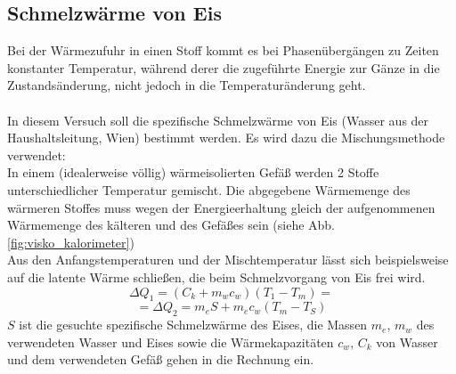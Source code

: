 \documentclass[12pt,a4paper]{article}
\begin{document}
\begin{multicols}{2}
\section{Schmelzwärme von Eis}
Bei der Wärmezufuhr in einen Stoff kommt es bei Phasenübergängen zu Zeiten konstanter Temperatur, während derer die zugeführte Energie zur Gänze in die Zustandsänderung, nicht jedoch in die Temperaturänderung geht.\\
\\
In diesem Versuch soll die spezifische Schmelzwärme von Eis (Wasser aus der Haushaltsleitung, Wien) bestimmt werden. Es wird dazu die Mischungsmethode verwendet:\\
In einem (idealerweise völlig) wärmeisolierten Gefäß werden 2 Stoffe unterschiedlicher Temperatur gemischt. Die abgegebene Wärmemenge des wärmeren Stoffes muss wegen der Energieerhaltung gleich der aufgenommenen Wärmemenge des kälteren und des Gefäßes sein (siehe Abb. \ref{fig:visko_kalorimeter})\\
Aus den Anfangstemperaturen und der Mischtemperatur lässt sich beispielsweise auf die latente Wärme schließen, die beim Schmelzvorgang von Eis frei wird.
$$\Delta Q_1=(C_k+m_wc_w)(T_1-T_m)=$$
$$=\Delta Q_2 = m_eS+m_ec_w(T_m-T_S)$$
$S$ ist die gesuchte spezifische Schmelzwärme des Eises, die Massen $m_e$, $m_w$ des verwendeten Wasser und Eises sowie die Wärmekapazitäten $c_w$, $C_k$ von Wasser und dem verwendeten Gefäß gehen in die Rechnung ein.\\



\end{multicols}
\end{document}
